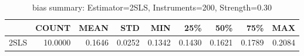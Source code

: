 \begin{table}[ht]
\centering
\caption{bias summary: Estimator=2SLS, Instruments=200, Strength=0.30}
\begin{tabular}{lrrrrrrrr}
\toprule
 & COUNT & MEAN & STD & MIN & 25\% & 50\% & 75\% & MAX \\
\midrule
2SLS & 10.0000 & 0.1646 & 0.0252 & 0.1342 & 0.1430 & 0.1621 & 0.1789 & 0.2084 \\
\bottomrule
\end{tabular}
\end{table}
